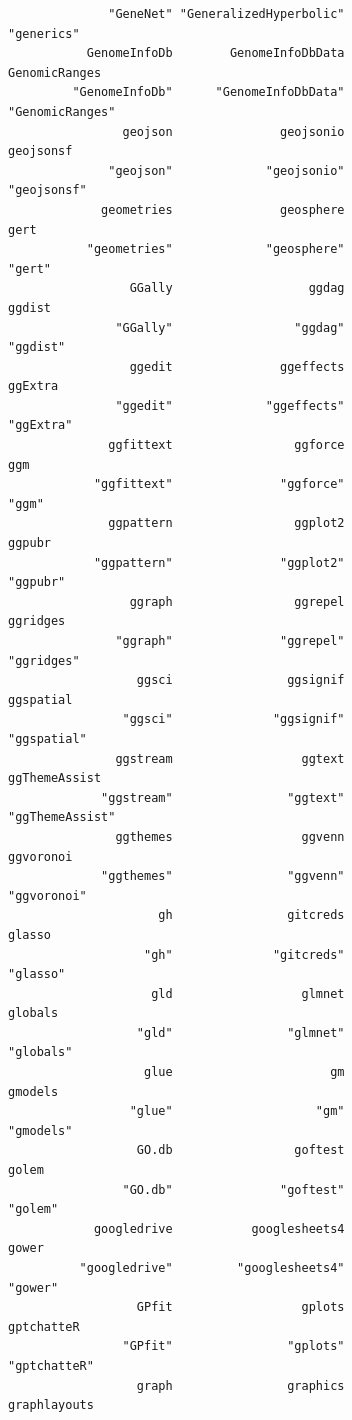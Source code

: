 \documentclass[
  letterpaper,
  DIV=11,
  numbers=noendperiod]{scrreprt}
\begin{document}
\begin{verbatim}
              "GeneNet" "GeneralizedHyperbolic"              "generics" 
           GenomeInfoDb        GenomeInfoDbData           GenomicRanges 
         "GenomeInfoDb"      "GenomeInfoDbData"         "GenomicRanges" 
                geojson               geojsonio               geojsonsf 
              "geojson"             "geojsonio"             "geojsonsf" 
             geometries               geosphere                    gert 
           "geometries"             "geosphere"                  "gert" 
                 GGally                   ggdag                  ggdist 
               "GGally"                 "ggdag"                "ggdist" 
                 ggedit               ggeffects                 ggExtra 
               "ggedit"             "ggeffects"               "ggExtra" 
              ggfittext                 ggforce                     ggm 
            "ggfittext"               "ggforce"                   "ggm" 
              ggpattern                 ggplot2                  ggpubr 
            "ggpattern"               "ggplot2"                "ggpubr" 
                 ggraph                 ggrepel                ggridges 
               "ggraph"               "ggrepel"              "ggridges" 
                  ggsci                ggsignif               ggspatial 
                "ggsci"              "ggsignif"             "ggspatial" 
               ggstream                  ggtext           ggThemeAssist 
             "ggstream"                "ggtext"         "ggThemeAssist" 
               ggthemes                  ggvenn               ggvoronoi 
             "ggthemes"                "ggvenn"             "ggvoronoi" 
                     gh                gitcreds                  glasso 
                   "gh"              "gitcreds"                "glasso" 
                    gld                  glmnet                 globals 
                  "gld"                "glmnet"               "globals" 
                   glue                      gm                 gmodels 
                 "glue"                    "gm"               "gmodels" 
                  GO.db                 goftest                   golem 
                "GO.db"               "goftest"                 "golem" 
            googledrive           googlesheets4                   gower 
          "googledrive"         "googlesheets4"                 "gower" 
                  GPfit                  gplots              gptchatteR 
                "GPfit"                "gplots"            "gptchatteR" 
                  graph                graphics            graphlayouts 

\end{verbatim}
\end{document}
